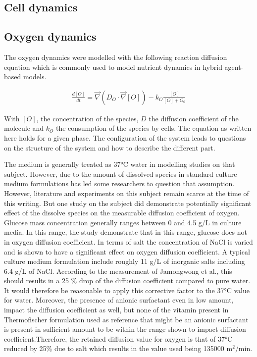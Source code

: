 \documentclass[11pt,a4paper]{article}
\begin{document}
\subsection{Cell dynamics}

\subsection{Oxygen dynamics}
The oxygen dynamics were modelled with the following reaction diffusion equation which is commonly used to model nutrient dynamics in hybrid agent-based models. \cite{Mao2018}\cite{Kempf2005}\cite{Bull2020}

\begin{align}
\label{eqn:O} \frac{d [O]}{d t} = \overrightarrow{\nabla} (D_O \cdot \overrightarrow{\nabla} [O]) - k_O \frac{[O]}{[O] + O_0}  
\end{align}

With $[O]$, the concentration of the species, $D$ the diffusion coefficient of the molecule and $k_O$ the consumption of the species by cells. The equation as written here holds for a given phase.  The configuration of the system leads to questions on the structure of the system and how to describe the different part.

The medium is generally treated as 37°C water in modelling studies on that subject.\cite{Mao2018}\cite{Bull2020}\cite{Jagiella2016}\cite{Kempf2005} However, due to the amount of dissolved species in standard culture medium formulations has led some researchers to question that assumption. However, literature and experiments on this subject remain scarce at the time of this writing. But one study on the subject did demonstrate potentially significant effect of the dissolve species on the measurable diffusion coefficient of oxygen.\cite{Jamongwong2010} Glucose mass concentration generally ranges between 0 and 4.5 g/L in culture media. In this range, the study demonstrate that in this range, glucose does not in oxygen diffusion coefficient. In terms of salt the concentration of NaCl is varied and is shown to have a significant effect on oxygen diffusion coefficient. A typical culture medium formulation include roughly 11 g/L of inorganic salts including 6.4 g/L of NaCl. According to the measurement of Jamongwong et al., this should results in a 25 \% drop of the diffusion coefficient compared to pure water. It would therefore be reasonable to apply this corrective factor to the 37°C value for water. Moreover, the presence of anionic surfactant even in low amount, impact the diffusion coefficient as well, but none of the vitamin present in Thermofischer formulation used as reference that might be an anionic surfactant is present in sufficient amount to be within the range shown to impact diffusion coefficient.Therefore, the retained diffusion value for oxygen is that of 37°C reduced by  25\% due to salt which results in the value used being 135000 \textmu m$^2$/min.
\end{document}
